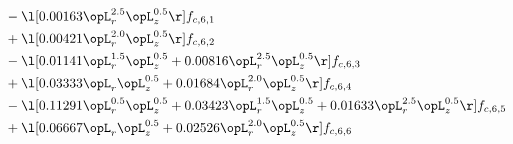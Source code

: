 \begin{alignat}{2}
& - \l[  0.00163 \opL_r^{2.5} \opL_z^{0.5}  \r] f_{c,6,1} \nonumber \\ 
& + \l[  0.00421 \opL_r^{2.0} \opL_z^{0.5}  \r] f_{c,6,2} \nonumber \\ 
& - \l[  0.01141 \opL_r^{1.5} \opL_z^{0.5} +  0.00816 \opL_r^{2.5} \opL_z^{0.5}  \r] f_{c,6,3} \nonumber \\ 
& + \l[  0.03333 \opL_r \opL_z^{0.5} +  0.01684 \opL_r^{2.0} \opL_z^{0.5}  \r] f_{c,6,4} \nonumber \\ 
& - \l[  0.11291 \opL_r^{0.5} \opL_z^{0.5} +  0.03423 \opL_r^{1.5} \opL_z^{0.5} +  0.01633 \opL_r^{2.5} \opL_z^{0.5}  \r] f_{c,6,5} \nonumber \\ 
& + \l[  0.06667 \opL_r \opL_z^{0.5} +  0.02526 \opL_r^{2.0} \opL_z^{0.5}  \r] f_{c,6,6} \nonumber \\ 
\end{alignat} 


